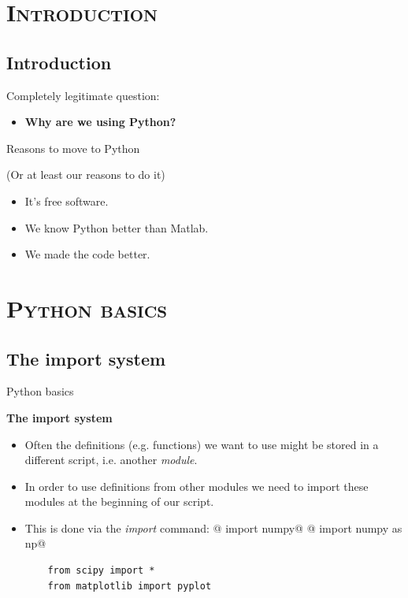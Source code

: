 \documentclass[xcolor=x11names, compress]{beamer}
\renewcommand{\(}{\begin{columns}}
\renewcommand{\)}{\end{columns}}
\newcommand{\<}[1]{\begin{column}{#1}}
\renewcommand{\>}{\end{column}}
\begin{document}
\section{ \scshape Introduction}
\subsection{Introduction}
\begin{frame}{}
\large

Completely legitimate question:

\vfill
\pause

\begin{itemize}
  \item \textbf{\Large Why are we using Python?}
\end{itemize}

\vfill

\end{frame}

\begin{frame}{Reasons to move to Python}

  (Or at least our reasons to do it)

  \begin{itemize}
    \Large
    \newcommand{\myitem}{\vfill \pause \item[{\color{darkgreen}\checkmark}]}
    \myitem It's free software.
    \myitem We know Python better than Matlab.
    \myitem We made the code better.
  \end{itemize}

\end{frame}


\section{\scshape Python basics}
\subsection{The import system}
\begin{frame}[fragile]{Python basics}

\textbf{The import system}

\begin{itemize}
	\item Often the definitions (e.g. functions) we want to use might be stored in a different script, i.e. another \textit{module}.
	\item In order to use definitions from other modules we need to import these modules at the beginning of our script.
	\item This is done via the \textit{import} command: 
  @    import numpy@
  @    import numpy as np@
  \begin{verbatim}
    from scipy import *
    from matplotlib import pyplot
  \end{verbatim}
\end{itemize}

\end{frame}
\end{document}
